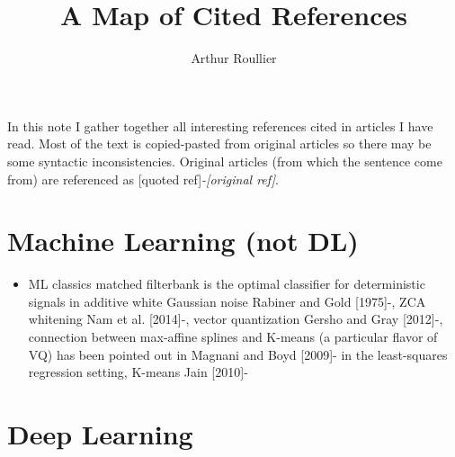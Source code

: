 \documentclass{article}
\title{A Map of Cited References}
\author{Arthur Roullier}
\begin{document}
\maketitle

%


In this note I gather together all interesting references cited in articles I have read. Most of the text is copied-pasted from original articles so there may be some syntactic inconsistencies. Original articles (from which the sentence come from) are referenced as [quoted ref]\emph{-[original ref]}.

\section{Machine Learning (not DL)}

\begin{itemize}
	\item ML classics
		\subitem matched filterbank is the optimal classifier for deterministic signals in additive white Gaussian noise Rabiner and Gold [1975]-\cite{balestriero_mad_2018}, ZCA whitening Nam et al. [2014]-\cite{balestriero_mad_2018}, vector quantization Gersho and Gray [2012]-\cite{balestriero_mad_2018}, connection between max-affine splines and K-means (a particular flavor of VQ) has been pointed out in Magnani and Boyd [2009]-\cite{balestriero_mad_2018} in the least-squares regression setting, K-means Jain [2010]-\cite{balestriero_mad_2018}
\end{itemize}


\section{Deep Learning}
\end{document}
